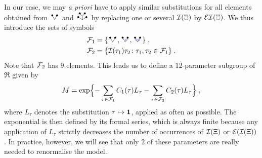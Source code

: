 \documentclass[reqno,11pt]{article}
\def\unit{\vone}
\begin{document}
In our case, we may \emph{a priori} have to apply similar substitutions for all
elements obtained from $\RSV$ and $\RSWV$ by replacing one or several ${\mathcal I}(\Xi)$
by ${\mathcal E}{\mathcal I}(\Xi)$. We thus introduce the sets of symbols 
\begin{align}
\nonumber
\cF_1 &= \set{\RSV,\RSVo,\RSVoo}\;, \\
\cF_2 &= \setsuch{\cI(\tau_1)\tau_2}{\tau_1,\tau_2\in\cF_1}\;.
\label{eq:rgen07} 
\end{align}
Note that ${\mathcal F}_2$ has $9$ elements. This leads us to define 
a $12$-parameter subgroup of $\mathfrak{R}$ given by 
\begin{equation}
 \label{eq:rgen08}
 M = \exp\Bigset{-\sum_{\tau\in\cF_1}C_1(\tau)L_\tau
 -\sum_{\tau\in\cF_2}C_2(\tau)L_\tau}\;,
\end{equation} 
where $L_\tau$ denotes the substitution $\tau\mapsto\unit$, applied as
often as possible. The exponential is then defined by its formal series, which
is always finite because any application of $L_\tau$ strictly decreases the
number of occurrences of ${\mathcal I}(\Xi)$ or ${\mathcal E}({\mathcal I}(\Xi))$. In practice,
however, we will see that only $2$ of these parameters are really needed
to renormalise the model. 
\end{document}
